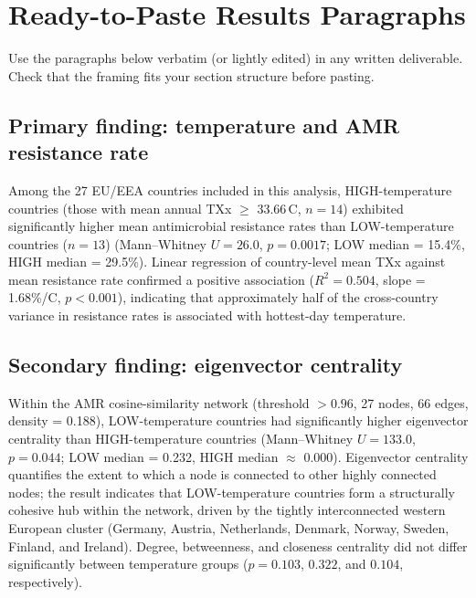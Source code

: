 \documentclass[12pt,a4paper]{article}
\begin{document}
\section{Ready-to-Paste Results Paragraphs}

Use the paragraphs below verbatim (or lightly edited) in any written
deliverable.
Check that the framing fits your section structure before pasting.

\subsection*{Primary finding: temperature and AMR resistance rate}

Among the 27 EU/EEA countries included in this analysis,
HIGH-temperature countries (those with mean annual TXx $\geq$ 33.66\,\textdegree{}C,
$n = 14$) exhibited significantly higher mean antimicrobial resistance rates
than LOW-temperature countries ($n = 13$)
(Mann--Whitney $U = 26.0$, $p = 0.0017$;
LOW median = 15.4\%, HIGH median = 29.5\%).
Linear regression of country-level mean TXx against mean resistance rate
confirmed a positive association ($R^2 = 0.504$, slope = 1.68\%/\textdegree{}C,
$p < 0.001$), indicating that approximately half of the cross-country variance
in resistance rates is associated with hottest-day temperature.

\subsection*{Secondary finding: eigenvector centrality}

Within the AMR cosine-similarity network (threshold $> 0.96$, 27 nodes,
66 edges, density = 0.188), LOW-temperature countries had significantly
higher eigenvector centrality than HIGH-temperature countries
(Mann--Whitney $U = 133.0$, $p = 0.044$;
LOW median = 0.232, HIGH median $\approx$ 0.000).
Eigenvector centrality quantifies the extent to which a node is connected
to other highly connected nodes; the result indicates that LOW-temperature
countries form a structurally cohesive hub within the network,
driven by the tightly interconnected western European cluster
(Germany, Austria, Netherlands, Denmark, Norway, Sweden, Finland,
and Ireland).
Degree, betweenness, and closeness centrality did not differ
significantly between temperature groups
($p = 0.103$, $0.322$, and $0.104$, respectively).
\end{document}
